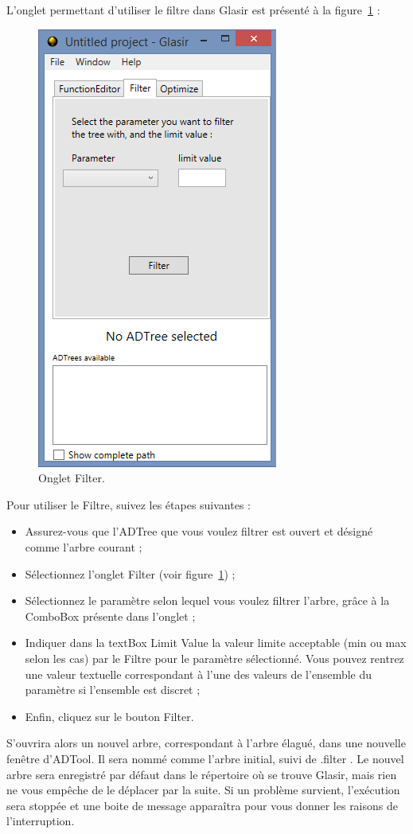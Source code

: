 L'onglet permettant d'utiliser le filtre dans Glasir est présenté à la {\sc figure}~\ref{fig:filter} :

 \begin{figure}[H]
        \centering
        \includegraphics[height=0.7\textwidth]{figure/filter.png}
        \caption{Onglet Filter.}
        \label{fig:filter}
    \end{figure}

Pour utiliser le Filtre, suivez les étapes suivantes :

\begin{itemize}
\item Assurez-vous que l'ADTree que vous voulez filtrer est ouvert et désigné comme l'arbre courant ;
\item Sélectionnez l'onglet \og Filter \fg{} (voir {\sc figure}~\ref{fig:filter}) ;
\item Sélectionnez le paramètre selon lequel vous voulez filtrer l'arbre, grâce à la ComboBox présente dans l'onglet ;
\item Indiquer dans la textBox \og Limit Value \fg{} la valeur limite acceptable (min ou max selon les cas) par le Filtre pour le paramètre sélectionné. Vous pouvez rentrez une valeur textuelle correspondant à l'une des valeurs de l'ensemble du paramètre si l'ensemble est discret ;
\item Enfin, cliquez sur le bouton \og Filter\fg{}.
\end{itemize}

S'ouvrira alors un nouvel arbre, correspondant à l'arbre élagué, dans une nouvelle fenêtre d'ADTool. Il sera nommé comme l'arbre initial, suivi de \og .filter \fg{}. Le nouvel arbre sera enregistré par défaut dans le répertoire où se trouve Glasir, mais rien ne vous empêche de le déplacer par la suite.
Si un problème survient, l'exécution sera stoppée et une boite de message apparaîtra pour vous donner les raisons de l'interruption.

